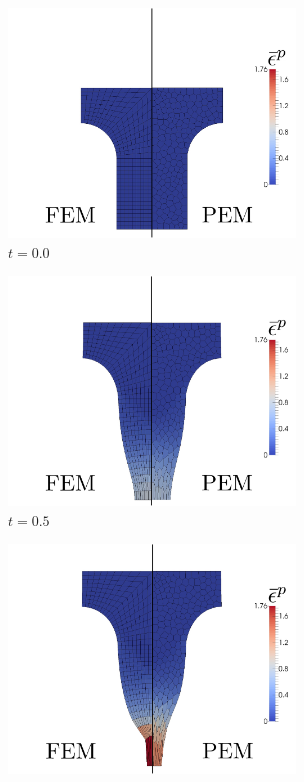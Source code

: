 \begin{figure}[!h]
    \centering
    \begin{subfigure}[b]{0.49\linewidth}
            \centering
            \includegraphics[width=3.0in]{figures/necking_eqps_0.pdf}
    			\caption{$t=0.0$ \label{fig:necking_eqps_0}}
    \end{subfigure}
	\begin{subfigure}[b]{0.49\linewidth}
            \centering
            \includegraphics[width=3.0in]{figures/necking_eqps_1.pdf}
    			\caption{$t=0.5$ \label{fig:necking_eqps_1}}
    \end{subfigure}
    \begin{subfigure}[b]{0.49\linewidth}
            \centering
            \includegraphics[width=3.0in]{figures/necking_eqps_2.pdf}

\end{subfigure}
\end{figure}
